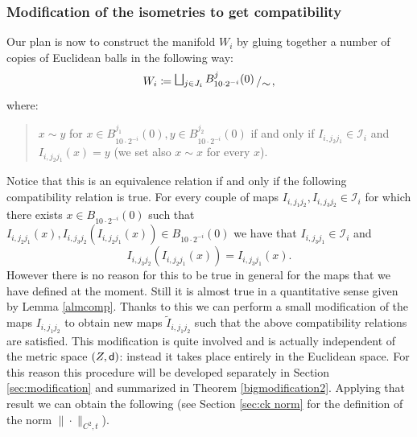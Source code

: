 \documentclass[11pt]{article}
\newcommand{\bigslant}[2]{{\raisebox{.2em}{$#1$}\left/\raisebox{-.2em}{$#2$}\right.}}
\newcommand{\sfd}{{\sf d}}
\theoremstyle{plain}
\theoremstyle{definition}
\numberwithin{equation}{section}
\begin{document}
\subsubsection{Modification of the isometries to get compatibility}\label{sec:modification charts}
Our plan is now to construct the manifold $W_i$ by gluing together a number of copies of Euclidean balls in the following way:
\[ W_i\coloneqq  \bigslant{\bigsqcup_{j \in J_i} B^j_{10\cdot 2^{-i}}(0) }{\sim},	 \]
where:
\begin{quote}
    $x \sim y$ for $x \in B^{j_1}_{10\cdot 2^{-i}}(0), y \in B^{j_2}_{10\cdot 2^{-i}}(0) $ if and only if $I_{i,j_2j_1}\in \mathcal I_i$ and  $I_{i,j_2j_1}(x)=y$  (we set  also $x \sim x$ for every $x$).
\end{quote}
  Notice that this is an equivalence relation if and only if the following compatibility relation is true. 
For every couple of maps $I_{i,j_1j_2},I_{i,j_3j_2}\in \mathcal I_i$ for which there exists $x \in B_{10\cdot 2^{-i}}(0)$ such that $I_{i,j_2j_1}(x),I_{i,j_3j_2}(I_{i,j_2j_1}(x))\in B_{10\cdot 2^{-i}}(0)$ we have that  $I_{i,j_3j_1}\in \mathcal I_i$  and 
\[  I_{i,j_3j_2}( I_{i,j_2j_1}(x))=I_{i,j_3j_1}(x).\]
However there is no reason for this to be true in general for the maps that we have defined at the moment. Still it is almost true in a quantitative sense given by  Lemma \eqref{almcomp}. Thanks to this we can perform a small modification of the maps $I_{i,j_1j_2}$ to obtain new maps $\widetilde I_{i,j_1j_2}$ such that the above compatibility relations are satisfied. This modification is quite involved and is actually independent of the metric space $(Z,\sfd)$: instead it takes place entirely in the Euclidean space. For this reason this procedure will be developed separately in Section \ref{sec:modification} and summarized in Theorem \ref{bigmodification2}. Applying that result we can obtain the following (see Section \ref{sec:ck norm} for the definition of the norm $\|\cdot \|_{C^2,t}$).
\end{document}
